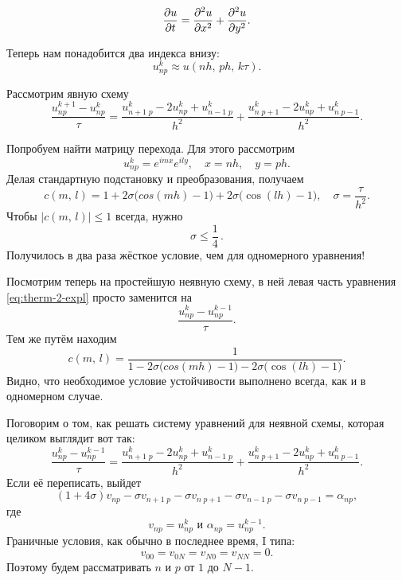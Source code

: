 \documentclass{trlnotes}
\begin{document}
	\begin{de}
		\[
			\dfrac{\partial u}{\partial t} = \dfrac{\partial^2 u}{\partial x^2} + \dfrac{\partial^2 u}{\partial y^2}.
		\]
	\end{de}

	Теперь нам понадобится два индекса внизу:
	\[
		u^k_{np} \approx u(nh, \, ph, \, k\tau).
	\]

	Рассмотрим явную схему
	\begin{equation}\label{eq:therm-2-expl}
		\dfrac{u^{k+1}_{np} - u^k_{np}}{\tau} = \dfrac{u^k_{n+1 \; p} - 2u^k_{np} + u^k_{n-1 \; p}}{h^2} + \dfrac{u^k_{n \; p+1} - 2u^k_{np} + u^k_{n \; p - 1}}{h^2}.
	\end{equation}

	Попробуем найти матрицу перехода. Для этого рассмотрим 
	\[
		u^k_{np} = e^{imx} e^{ily}, \quad x = nh, \quad y = ph.
	\]
	Делая стандартную подстановку и преобразования, получаем
	\[
		c(m, \, l) = 1 + 2\sigma\big(cos(mh) - 1\big) + 2\sigma\big(\cos(lh) - 1\big), \quad \sigma = \dfrac{\tau}{h^2}.
	\]
	Чтобы $\big|c(m, \, l)\big| \leqslant 1$ всегда, нужно
	\[
		\boxed{\sigma \leqslant \dfrac{1}{4}}\,.
	\]
	Получилось в два раза жёсткое условие, чем для одномерного уравнения!

	Посмотрим теперь на простейшую неявную схему, в ней левая часть уравнения \ref{eq:therm-2-expl} просто заменится на
	\[
		\dfrac{u^{k}_{np} - u^{k-1}_{np}}{\tau}.
	\]
	Тем же путём находим
	\[ 
		c(m, \, l) = \dfrac{1}{1 - 2\sigma\big(cos(mh) - 1\big) - 2\sigma\big(\cos(lh) - 1\big)}.
	\]
	Видно, что необходимое условие устойчивости выполнено всегда, как и в одномерном случае.

	Поговорим о том, как решать систему уравнений для неявной схемы, которая целиком выглядит вот так:
	\[
		\dfrac{u^{k}_{np} - u^{k-1}_{np}}{\tau} = \dfrac{u^k_{n+1 \; p} - 2u^k_{np} + u^k_{n-1 \; p}}{h^2} + \dfrac{u^k_{n \; p+1} - 2u^k_{np} + u^k_{n \; p - 1}}{h^2}.
	\]
	Если её переписать, выйдет
	\[
		(1 + 4\sigma) v_{np} - \sigma v_{n + 1\; p} - \sigma v_{n \; p+1} - \sigma v_{n - 1\; p} - \sigma v_{n \; p-1} = \alpha_{np},
	\]
	где
	\[
		v_{np} = u_{np}^k \text{ и } \alpha_{np} = u^{k-1}_{np}.
	\]
	Граничные условия, как обычно в последнее время, I типа:
	\[
		v_{00} = v_{0N} = v_{N0} = v_{NN} = 0.
	\]
	Поэтому будем рассматривать $n$ и $p$ от $1$ до $N-1$. 
\end{document}
